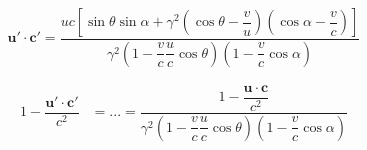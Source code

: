 \begin{equation}
	\mathbf{u}' \cdot \mathbf{c}' = \dfrac{ uc \left[ \sin\theta\sin\alpha + \gamma^2\left(\cos\theta - \dfrac{v}{u}\right)\left( \cos\alpha - \dfrac{v}{c} \right) \right]}{ \gamma^2 \left(1-\dfrac{v}{c}\dfrac{u}{c}\cos\theta \right) \left(1-\dfrac{v}{c}\cos\alpha \right)}
\end{equation}

\begin{equation}
	\begin{aligned}
		1 - \dfrac{\mathbf{u}' \cdot \mathbf{c}'}{c^2} & = ...
		= \dfrac{  1 - \dfrac{\mathbf{u}\cdot\mathbf{c}}{c^2}  }
		{ \gamma^2 \left(1-\dfrac{v}{c}\dfrac{u}{c}\cos\theta \right) \left(1-\dfrac{v}{c}\cos\alpha \right)}
	\end{aligned}
\end{equation}

